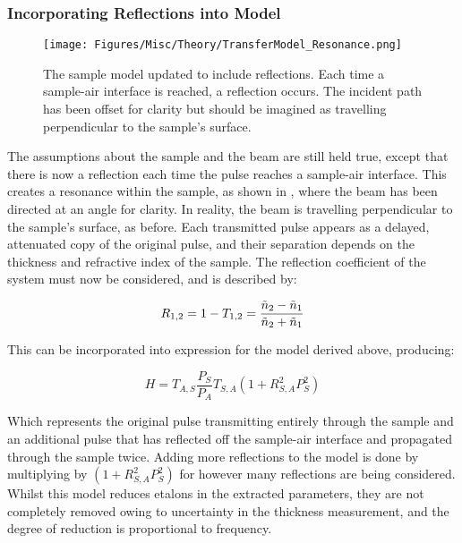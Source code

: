 \subsubsection{Incorporating Reflections into Model}
\begin{figure}
    \centering
    \texttt{[image: Figures/Misc/Theory/TransferModel\_Resonance.png]}
    \captionsetup{font = footnotesize, justification = centering}
    \caption[The Sample Model updated to include Reflections]{The sample model updated to include reflections. Each time a sample-air interface is reached, a reflection occurs. The incident path has been offset for clarity but should be imagined as travelling perpendicular to the sample’s surface.}
    \label{fig:transferreflections}
\end{figure}

The assumptions about the sample and the beam are still held true, except that there is now a reflection each time the pulse reaches a sample-air interface. This creates a resonance within the sample, as shown in , where the beam has been directed at an angle for clarity. In reality, the beam is travelling perpendicular to the sample’s surface, as before. Each transmitted pulse appears as a delayed, attenuated copy of the original pulse, and their separation depends on the thickness and refractive index of the sample. The reflection coefficient of the system must now be considered, and is described by:

\begin{equation}
R_{1,2} = 1 - T_{1,2} = \frac{\Tilde{n}_2-\Tilde{n}_1}{\Tilde{n}_2+\Tilde{n}_1}
\end{equation}

This can be incorporated into expression for the model derived above, producing:

\begin{equation}
H = T_{A,S} \frac{P_S}{P_A} T_{S,A} (1+R_{S,A}^2 P_S^2)
\end{equation}

Which represents the original pulse transmitting entirely through the sample and an additional pulse that has reflected off the sample-air interface and propagated through the sample twice. Adding more reflections to the model is done by multiplying by \((1+R_{S,A}^2 P_S^2)\) for however many reflections are being considered. Whilst this model reduces etalons in the extracted parameters, they are not completely removed owing to uncertainty in the thickness measurement, and the degree of reduction is proportional to frequency. 

